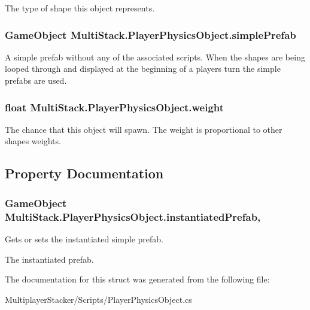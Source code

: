 The type of shape this object represents. 

\hypertarget{struct_multi_stack_1_1_player_physics_object_a9ea1890efae7166e3f97e09034dfd505}{}
\subsubsection[{simple\+Prefab}]{\setlength{\rightskip}{0pt plus 5cm}Game\+Object Multi\+Stack.\+Player\+Physics\+Object.\+simple\+Prefab}\label{struct_multi_stack_1_1_player_physics_object_a9ea1890efae7166e3f97e09034dfd505}


A simple prefab without any of the associated scripts. When the shapes are being looped through and displayed at the beginning of a players turn the simple prefabs are used. 

\hypertarget{struct_multi_stack_1_1_player_physics_object_a19e58a0ebb90ee69437a21f12093e758}{}
\subsubsection[{weight}]{\setlength{\rightskip}{0pt plus 5cm}float Multi\+Stack.\+Player\+Physics\+Object.\+weight}\label{struct_multi_stack_1_1_player_physics_object_a19e58a0ebb90ee69437a21f12093e758}


The chance that this object will spawn. The weight is proportional to other shapes weights. 



\subsection{Property Documentation}
\hypertarget{struct_multi_stack_1_1_player_physics_object_ac4a840e0e27b4696fbbf7fbb105bd528}{}
\subsubsection[{instantiated\+Prefab}]{\setlength{\rightskip}{0pt plus 5cm}Game\+Object Multi\+Stack.\+Player\+Physics\+Object.\+instantiated\+Prefab\hspace{0.3cm}{\ttfamily [get]}, {\ttfamily [set]}}\label{struct_multi_stack_1_1_player_physics_object_ac4a840e0e27b4696fbbf7fbb105bd528}


Gets or sets the instantiated simple prefab. 

The instantiated prefab.

The documentation for this struct was generated from the following file\+:\begin{DoxyCompactItemize}
\item 
Multiplayer\+Stacker/\+Scripts/Player\+Physics\+Object.\+cs\end{DoxyCompactItemize}

